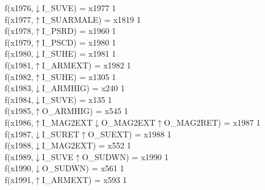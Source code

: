 f(x1976,$\downarrow$I\_SUVE) = x1977 {1} \\
f(x1977,$\uparrow$I\_SUARMALE) = x1819 {1} \\
f(x1978,$\uparrow$I\_PSRD) = x1960 {1} \\
f(x1979,$\uparrow$I\_PSCD) = x1980 {1} \\
f(x1980,$\downarrow$I\_SUHE) = x1981 {1} \\
f(x1981,$\uparrow$I\_ARMEXT) = x1982 {1} \\
f(x1982,$\uparrow$I\_SUHE) = x1305 {1} \\
f(x1983,$\downarrow$I\_ARMHIG) = x240 {1} \\
f(x1984,$\downarrow$I\_SUVE) = x135 {1} \\
f(x1985,$\uparrow$O\_ARMHIG) = x545 {1} \\
f(x1986,$\uparrow$I\_MAG2EXT$\downarrow$O\_MAG2EXT$\uparrow$O\_MAG2RET) = x1987 {1} \\
f(x1987,$\downarrow$I\_SURET$\uparrow$O\_SUEXT) = x1988 {1} \\
f(x1988,$\downarrow$I\_MAG2EXT) = x552 {1} \\
f(x1989,$\downarrow$I\_SUVE$\uparrow$O\_SUDWN) = x1990 {1} \\
f(x1990,$\downarrow$O\_SUDWN) = x561 {1} \\
f(x1991,$\uparrow$I\_ARMEXT) = x593 {1} \\
